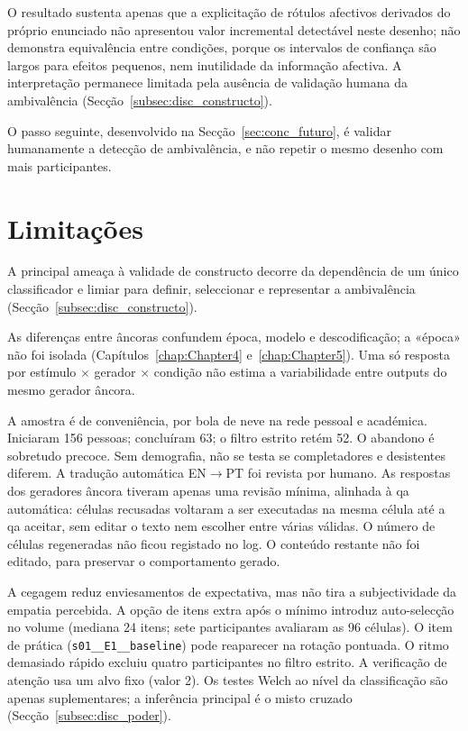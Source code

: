 O resultado sustenta apenas que a explicitação de rótulos afectivos derivados do próprio enunciado não apresentou valor incremental detectável neste desenho; não demonstra equivalência entre condições, porque os intervalos de confiança são largos para efeitos pequenos, nem inutilidade da informação afectiva. A interpretação permanece limitada pela ausência de validação humana da ambivalência (Secção~\ref{subsec:disc_constructo}).

O passo seguinte, desenvolvido na Secção~\ref{sec:conc_futuro}, é validar humanamente a detecção de ambivalência, e não repetir o mesmo desenho com mais participantes.


\section{Limitações}
\label{sec:conc_limitacoes}

A principal ameaça à validade de constructo decorre da dependência de um único classificador e limiar para definir, seleccionar e representar a ambivalência (Secção~\ref{subsec:disc_constructo}).

As diferenças entre âncoras confundem época, modelo e descodificação; a «época» não foi isolada (Capítulos~\ref{chap:Chapter4} e~\ref{chap:Chapter5}). Uma só resposta por estímulo \(\times\) gerador \(\times\) condição não estima a variabilidade entre outputs do mesmo gerador âncora.

A amostra é de conveniência, por bola de neve na rede pessoal e académica. Iniciaram 156 pessoas; concluíram 63; o filtro estrito retém 52. O abandono é sobretudo precoce. Sem demografia, não se testa se completadores e desistentes diferem. A tradução automática EN\(\rightarrow\)PT foi revista por humano. As respostas dos geradores âncora tiveram apenas uma revisão mínima, alinhada à \gls{qa} automática: células recusadas voltaram a ser executadas na mesma célula até a \gls{qa} aceitar, sem editar o texto nem escolher entre várias válidas. O número de células regeneradas não ficou registado no log. O conteúdo restante não foi editado, para preservar o comportamento gerado.

A cegagem reduz enviesamentos de expectativa, mas não tira a subjectividade da empatia percebida. A opção de itens extra após o mínimo introduz auto-selecção no volume (mediana 24 itens; sete participantes avaliaram as 96 células). O item de prática (\texttt{s01\_\_E1\_\_baseline}) pode reaparecer na rotação pontuada. O ritmo demasiado rápido excluiu quatro participantes no filtro estrito. A verificação de atenção usa um alvo fixo (valor 2). Os testes Welch ao nível da classificação são apenas suplementares; a inferência principal é o misto cruzado (Secção~\ref{subsec:disc_poder}).

